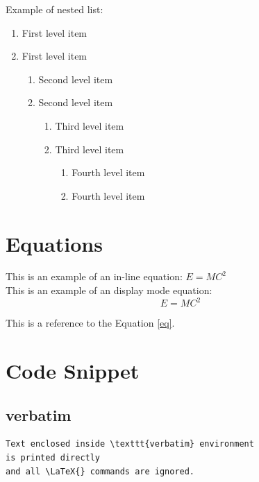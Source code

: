 \documentclass[../main.tex]{subfiles}
\begin{document}
Example of nested list:
\begin{enumerate}
   \item First level item
   \item First level item
   \begin{enumerate}
     \item Second level item
     \item Second level item
     \begin{enumerate}
       \item Third level item
       \item Third level item
       \begin{enumerate}
         \item Fourth level item
         \item Fourth level item
       \end{enumerate}
     \end{enumerate}
   \end{enumerate}
 \end{enumerate}


\section{Equations}

This is an example of an in-line equation: $E = MC^2$\\
This is an example of an display mode equation:
\begin{equation}
    E = MC^2
\label{eq}
\end{equation}

This is a reference to the Equation \ref{eq}.

\section{Code Snippet}

\subsection{verbatim}
\begin{verbatim}
Text enclosed inside \texttt{verbatim} environment 
is printed directly 
and all \LaTeX{} commands are ignored.
\end{verbatim}
\end{document}
